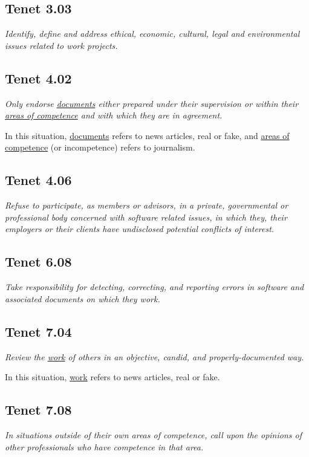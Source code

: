 \subsection{Tenet 3.03}

\emph{Identify, define and address ethical, economic, cultural, legal and environmental issues related to work projects. \cite{se_code}}


\subsection{Tenet 4.02}

\emph{Only endorse \underline{documents} either prepared under their supervision or within their \underline{areas of competence} and with which they are in agreement. \cite{se_code}}

In this situation, \underline{documents} refers to news articles, real or fake, and \underline{areas of competence} (or incompetence) refers to journalism.

\subsection{Tenet 4.06}

\emph{Refuse to participate, as members or advisors, in a private, governmental or professional body concerned with software related issues, in which they, their employers or their clients have undisclosed potential conflicts of interest. \cite{se_code}}

\subsection{Tenet 6.08}

\emph{Take responsibility for detecting, correcting, and reporting errors in software and associated documents on which they work. \cite{se_code}}

\subsection{Tenet 7.04}

\emph{Review the \underline{work} of others in an objective, candid, and properly-documented way. \cite{se_code}}

In this situation, \underline{work} refers to news articles, real or fake.


\subsection{Tenet 7.08}

\emph{In situations outside of their own areas of competence, call upon the opinions of other professionals who have competence in that area. \cite{se_code}}
